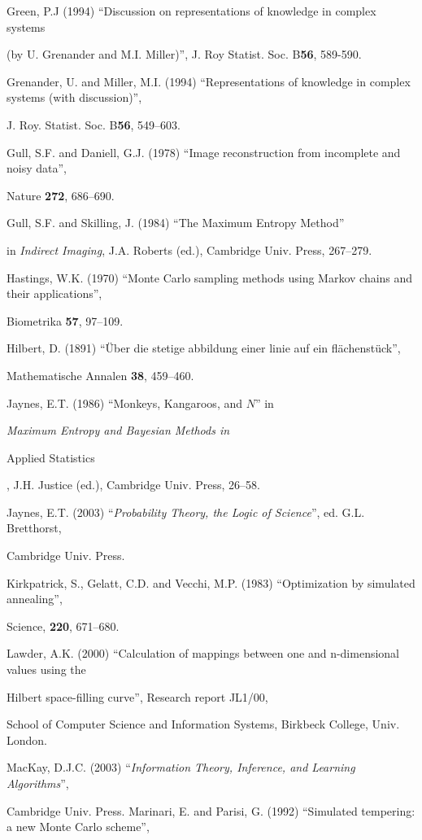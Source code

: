 \noindent Green, P.J (1994) ``Discussion on representations of knowledge in complex systems

 (by U. Grenander and M.I. Miller)'', J. Roy Statist. Soc. B{\bf 56}, 589-590.

\noindent Grenander, U. and Miller, M.I. (1994) ``Representations of knowledge in complex systems (with discussion)'', 

J. Roy. Statist. Soc. B{\bf 56}, 549--603.

\noindent Gull, S.F. and Daniell, G.J. (1978) ``Image reconstruction from incomplete and noisy data'',

 Nature {\bf 272}, 686--690.

\noindent Gull, S.F. and Skilling, J. (1984) ``The Maximum Entropy Method'' 

 in {\it Indirect Imaging}, J.A. Roberts (ed.), Cambridge Univ. Press, 267--279.

\noindent Hastings, W.K. (1970) ``Monte Carlo sampling methods using Markov chains and their applications'',

 Biometrika {\bf 57}, 97--109.

\noindent Hilbert, D. (1891) ``\"Uber die stetige abbildung einer linie auf ein fl\"achenst\"uck'',

 Mathematische Annalen {\bf 38}, 459--460.

\noindent Jaynes, E.T. (1986) ``Monkeys, Kangaroos, and $N$'' in {\it Maximum Entropy and Bayesian Methods in

 Applied Statistics}, J.H. Justice (ed.), Cambridge Univ. Press, 26--58.

\noindent Jaynes, E.T. (2003) ``{\it Probability Theory, the Logic of Science}'', ed. G.L. Bretthorst,

 Cambridge Univ. Press.

\noindent Kirkpatrick, S., Gelatt, C.D. and Vecchi, M.P. (1983) ``Optimization by simulated annealing'',

 Science, {\bf 220}, 671--680.

\noindent Lawder, A.K. (2000)  ``Calculation of mappings between one and n-dimensional values using the

 Hilbert space-filling curve'',  Research report JL1/00,

 School of Computer Science and Information Systems, Birkbeck College, Univ. London.

\noindent MacKay, D.J.C. (2003) ``{\it Information Theory, Inference, and Learning Algorithms}'',

 Cambridge Univ. Press.
\vfill\eject
\noindent Marinari, E. and Parisi, G. (1992) ``Simulated tempering: a new Monte Carlo scheme'',

